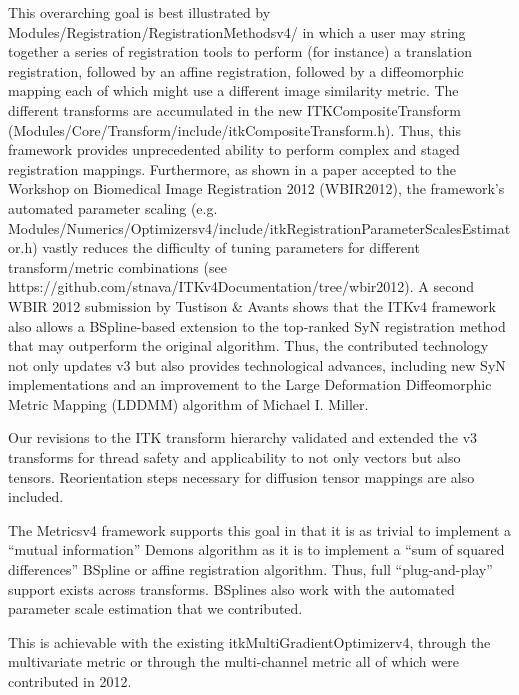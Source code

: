 \documentclass{frontiersSCNS}
\begin{document}
This overarching goal is best illustrated by Modules/Registration/RegistrationMethodsv4/ in which a user may string together a series of registration tools to perform (for instance) a translation registration, followed by an affine registration, followed by a diffeomorphic mapping each of which might use a different image similarity metric.  The different transforms are accumulated in the new ITKCompositeTransform (Modules/Core/Transform/include/itkCompositeTransform.h).  Thus, this framework provides unprecedented ability to perform complex and staged registration mappings.  Furthermore, as shown in a paper accepted to the Workshop on Biomedical Image Registration 2012 (WBIR2012), the framework’s automated parameter scaling (e.g. Modules/Numerics/Optimizersv4/include/itkRegistrationParameterScalesEstimator.h) vastly reduces the difficulty of tuning parameters for different transform/metric combinations (see https://github.com/stnava/ITKv4Documentation/tree/wbir2012).  A second WBIR 2012 submission by Tustison \& Avants shows that the ITKv4 framework also allows a BSpline-based extension to the top-ranked SyN registration method that may outperform the original algorithm.  Thus, the contributed technology not only updates v3 but also provides technological advances, including new SyN implementations and an improvement to the Large Deformation Diffeomorphic Metric Mapping (LDDMM) algorithm of Michael I. Miller.  


Our revisions to the ITK transform hierarchy validated and extended the v3 transforms for thread safety and applicability to not only vectors but also tensors.  Reorientation steps necessary for diffusion tensor mappings are also included.   

The Metricsv4 framework supports this goal in that it is as trivial to
implement a “mutual information” Demons algorithm as it is to
implement a “sum of squared differences” BSpline or affine
registration algorithm.  Thus, full “plug-and-play” support exists
across transforms.   BSplines also work with the automated parameter scale estimation that we contributed.  

This is achievable with the existing itkMultiGradientOptimizerv4,
through the multivariate metric or through the multi-channel metric
all of which were contributed in 2012.
\end{document}
